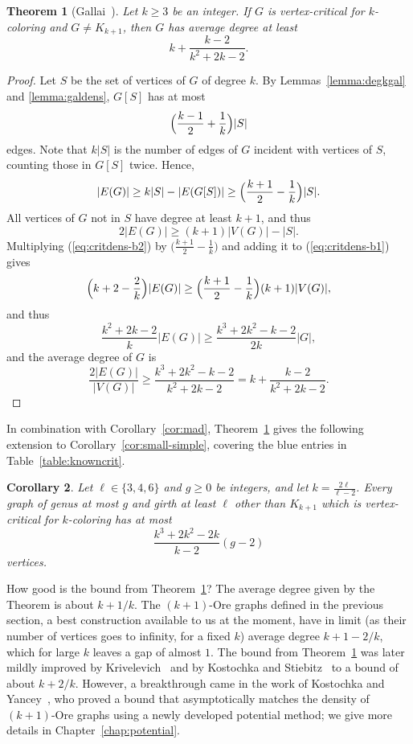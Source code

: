 \documentclass[12pt,twoside,openright,a4paper]{book}
\newtheorem{theorem}{Theorem}[chapter]
\newtheorem{corollary}[theorem]{Corollary}
\begin{document}
\begin{theorem}[Gallai~\cite{galfor}]\label{thm:critdens}
Let $k\ge 3$ be an integer.  If $G$ is vertex-critical for $k$-coloring and $G\neq K_{k+1}$, then $G$ has average degree
at least
$$k+\frac{k-2}{k^2+2k-2}.$$
\end{theorem}
\begin{proof}
Let $S$ be the set of vertices of $G$ of degree $k$.  By Lemmas~\ref{lemma:degkgal} and \ref{lemma:galdens},
$G[S]$ has at most $$\Bigl(\frac{k-1}{2}+\frac{1}{k}\Bigr)|S|$$ edges.  Note that $k|S|$ is the number of edges of $G$ incident with vertices of $S$,
counting those in $G[S]$ twice.  Hence,
\begin{equation}\label{eq:critdens-b1}
|E(G)|\ge k|S|-|E(G[S])|\ge \Bigl(\frac{k+1}{2}-\frac{1}{k}\Bigr)|S|.
\end{equation}
All vertices of $G$ not in $S$ have degree at least $k+1$, and thus
\begin{equation}\label{eq:critdens-b2}
2|E(G)|\ge (k+1)|V(G)|-|S|.
\end{equation}
Multiplying (\ref{eq:critdens-b2}) by $\bigl(\tfrac{k+1}{2}-\tfrac{1}{k}\bigr)$ and adding it to (\ref{eq:critdens-b1}) gives
$$\Bigl(k+2-\frac{2}{k}\Bigr)|E(G)|\ge\Bigl(\frac{k+1}{2}-\frac{1}{k}\Bigr)(k+1)|V(G)|,$$
and thus
$$\frac{k^2+2k-2}{k}|E(G)|\ge\frac{k^3+2k^2-k-2}{2k}|G|,$$
and the average degree of $G$ is
$$\frac{2|E(G)|}{|V(G)|}\ge \frac{k^3+2k^2-k-2}{k^2+2k-2}=k+\frac{k-2}{k^2+2k-2}.$$
\end{proof}
In combination with Corollary~\ref{cor:mad}, Theorem~\ref{thm:critdens} gives the following extension to Corollary~\ref{cor:small-simple}, covering the blue entries in Table~\ref{table:knowncrit}.
\begin{corollary}\label{cor:small-medium}
Let $\ell\in\{3,4,6\}$ and $g\ge 0$ be integers, and let $k=\tfrac{2\ell}{\ell-2}$.  Every graph of genus at most $g$ and girth at least $\ell$
other than $K_{k+1}$ which is vertex-critical for $k$-coloring has at most $$\frac{k^3+2k^2-2k}{k-2}(g-2)$$ vertices.
\end{corollary}

How good is the bound from Theorem~\ref{thm:critdens}?  The average degree given by the Theorem is about $k+1/k$.
The $(k+1)$-Ore graphs defined in the previous section, a best construction available to us at the moment,
have in limit (as their number of vertices goes to infinity, for a fixed $k$) average degree $k+1-2/k$, which for large $k$ leaves a gap of almost $1$.
The bound from Theorem~\ref{thm:critdens} was later mildly improved by Krivelevich~\cite{krivelevich1997minimal}
and by Kostochka and Stiebitz~\cite{kostochka1996excess} to a bound of about $k+2/k$.  However, a breakthrough came in the work of Kostochka and Yancey~\cite{koyanore},
who proved a bound that asymptotically matches the density of $(k+1)$-Ore graphs using a newly developed potential method; we give more details in Chapter~\ref{chap:potential}.
\end{document}
